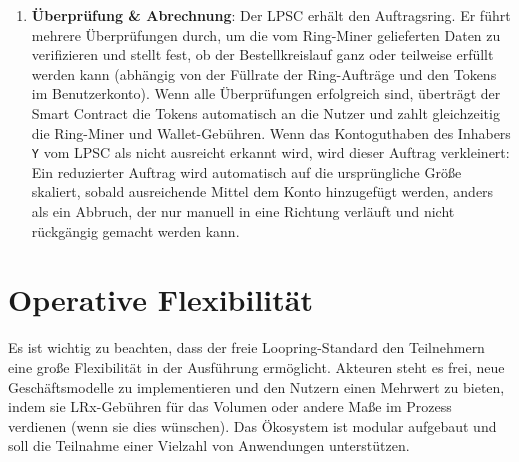 \documentclass[UTF8,nofonts]{article}
\makeatletter
\newenvironment{figurehere}
 {\def\@captype{figure}}
 {}
\makeatother
\begin{document}
\begin{multicols}{2}
\begin{enumerate}
\item \textbf{Überprüfung \& Abrechnung}: Der LPSC erhält den Auftragsring. Er führt mehrere Überprüfungen durch, um die vom Ring-Miner gelieferten Daten zu verifizieren und stellt fest, ob der Bestellkreislauf ganz oder teilweise erfüllt werden kann (abhängig von der Füllrate der Ring-Aufträge und den Tokens im Benutzerkonto). Wenn alle Überprüfungen erfolgreich sind, überträgt der Smart Contract die Tokens automatisch an die Nutzer und zahlt gleichzeitig die Ring-Miner und Wallet-Gebühren. Wenn das Kontoguthaben des Inhabers \verb|Y| vom LPSC als nicht ausreicht erkannt wird, wird dieser Auftrag verkleinert: Ein reduzierter Auftrag wird automatisch auf die ursprüngliche Größe skaliert, sobald ausreichende Mittel dem Konto hinzugefügt werden, anders als ein Abbruch, der nur manuell in eine Richtung verläuft und nicht rückgängig gemacht werden kann.

\end{enumerate}





%
%
%

\section{Operative Flexibilität\label{sec:business_model}}
Es ist wichtig zu beachten, dass der freie Loopring-Standard den Teilnehmern eine große Flexibilität in der Ausführung ermöglicht. Akteuren steht es frei, neue Geschäftsmodelle zu implementieren und den Nutzern einen Mehrwert zu bieten, indem sie LRx-Gebühren für das Volumen oder andere Maße im Prozess verdienen (wenn sie dies wünschen). Das Ökosystem ist modular aufgebaut und soll die Teilnahme einer Vielzahl von Anwendungen unterstützen.


\end{multicols}
\end{document}
